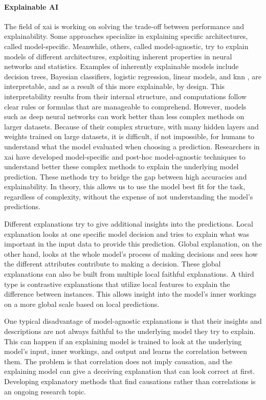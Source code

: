 \paragraph{Explainable AI\\}
The field of \gls{xai} is working on solving the trade-off between performance and explainability. Some approaches specialize in explaining specific architectures, called model-specific. Meanwhile, others, called model-agnostic, try to explain models of different architectures, exploiting inherent properties in neural networks and statistics. Examples of inherently explainable models include decision trees, Bayesian classifiers, logistic regression, linear models, and \gls{knn} \cite{fixDiscriminatoryAnalysisNonparametric1989, coverNearestNeighborPattern1967, molnarInterpretableMachineLearning}, are interpretable, and as a result of this more explainable, by design. This interpretability results from their internal structure, and computations follow clear rules or formulas that are manageable to comprehend.
However, models such as deep neural networks can work better than less complex methods on larger datasets. Because of their complex structure, with many hidden layers and weights trained on large datasets, it is difficult, if not impossible, for humans to understand what the model evaluated when choosing a prediction. Researchers in \gls{xai} have developed model-specific and post-hoc model-agnostic techniques to understand better these complex methods to explain the underlying model prediction. These methods try to bridge the gap between high accuracies and explainability.
In theory, this allows us to use the model best fit for the task, regardless of complexity, without the expense of not understanding the model's predictions. 

Different explanations try to give additional insights into the predictions. Local explanation looks at one specific model decision and tries to explain what was important in the input data to provide this prediction. Global explanation, on the other hand, looks at the whole model's process of making decisions and sees how the different attributes contribute to making a decision. These global explanations can also be built from multiple local faithful explanations. A third type is contrastive explanations that utilize local features to explain the difference between instances. This allows insight into the model's inner workings on a more global scale based on local predictions.

One typical disadvantage of model-agnostic explanations is that their insights and descriptions are not always faithful to the underlying model they try to explain. This can happen if an explaining model is trained to look at the underlying model's input, inner workings, and output and learns the correlation between them. The problem is that correlation does not imply causation, and the explaining model can give a deceiving explanation that can look correct at first. Developing explanatory methods that find causations rather than correlations is an ongoing research topic.




